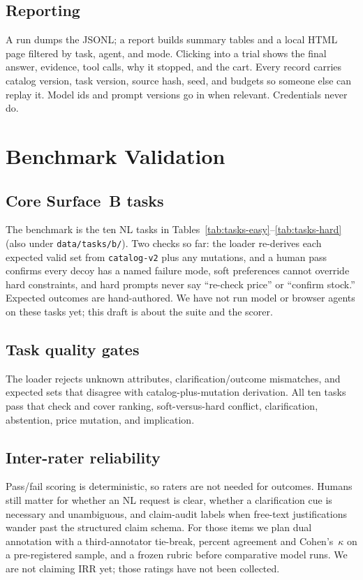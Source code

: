 \documentclass{article} %
\begin{document}
\subsection{Reporting}

A run dumps the JSONL; a report builds summary tables and a local HTML page filtered by task, agent, and mode. Clicking into a trial shows the final answer, evidence, tool calls, why it stopped, and the cart. Every record carries catalog version, task version, source hash, seed, and budgets so someone else can replay it. Model ids and prompt versions go in when relevant. Credentials never do.

\section{Benchmark Validation}
\label{sec:benchmark_validation}

\subsection{Core Surface~B tasks}

The benchmark is the ten NL tasks in Tables~\ref{tab:tasks-easy}--\ref{tab:tasks-hard} (also under \texttt{data/tasks/b/}). Two checks so far: the loader re-derives each expected valid set from \texttt{catalog-v2} plus any mutations, and a human pass confirms every decoy has a named failure mode, soft preferences cannot override hard constraints, and hard prompts never say ``re-check price'' or ``confirm stock.'' Expected outcomes are hand-authored. We have not run model or browser agents on these tasks yet; this draft is about the suite and the scorer.

\subsection{Task quality gates}

The loader rejects unknown attributes, clarification/outcome mismatches, and expected sets that disagree with catalog-plus-mutation derivation. All ten tasks pass that check and cover ranking, soft-versus-hard conflict, clarification, abstention, price mutation, and implication.

\subsection{Inter-rater reliability}

Pass/fail scoring is deterministic, so raters are not needed for outcomes. Humans still matter for whether an NL request is clear, whether a clarification cue is necessary and unambiguous, and claim-audit labels when free-text justifications wander past the structured claim schema. For those items we plan dual annotation with a third-annotator tie-break, percent agreement and Cohen's~$\kappa$ on a pre-registered sample, and a frozen rubric before comparative model runs. We are not claiming IRR yet; those ratings have not been collected.
\end{document}
